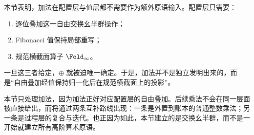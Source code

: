 \begin{remark}[加法不是新原语]
本节表明，加法在配置层与值层都不需要作为额外原语输入。配置层只需要：
\begin{enumerate}
  \item 逐位叠加这一自由交换幺半群操作；
  \item Fibonacci 值保持局部重写；
  \item 规范横截面算子 \(\Fold_\infty\)。
\end{enumerate}
一旦这三者给定，\(\oplus\) 就被迫唯一确定。于是，加法并不是独立发明出来的，而是“自由叠加经值保持归一化后在规范横截面上的投影”。
\end{remark}

\begin{remark}[与后续各节的关系]
本节只处理加法，因为加法正好对应配置层的自由叠加。后续乘法不会在同一层面被直接给出，而将通过两条互补路线出现：一条是外置到账本的普通整数乘法；另一条是过程层的复合与迭代。也正因为如此，本节建立的是交换幺半群，而不是一开始就建立所有高阶算术原语。
\end{remark}
